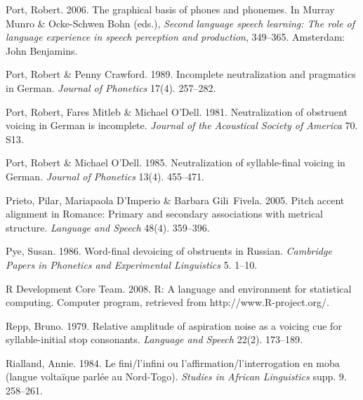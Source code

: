 \documentclass[ number=1
,series=labphon
,output=long
,url=http://langsci-press.org/catalog/book/16
,isbn=978-3-944675-01-5
]{LSP/langsci}
\begin{document}
\begin{thebibliography}{284}
Port, Robert. 2006.
\newblock The graphical basis of phones and phonemes.
\newblock In Murray Munro \& Ocke-Schwen Bohn (eds.), \emph{Second language
  speech learning: {T}he role of language experience in speech perception and
  production}, 349--365. Amsterdam: John Benjamins.

Port, Robert \& Penny Crawford. 1989.
\newblock Incomplete neutralization and pragmatics in {G}erman.
\newblock \emph{Journal of Phonetics} 17(4). 257--282.

Port, Robert, Fares Mitleb \& Michael O'Dell. 1981.
\newblock Neutralization of obstruent voicing in {G}erman is incomplete.
\newblock \emph{Journal of the Acoustical Society of America} 70. S13.

Port, Robert \& Michael O'Dell. 1985.
\newblock Neutralization of syllable-final voicing in {G}erman.
\newblock \emph{Journal of Phonetics} 13(4). 455--471.

Prieto, Pilar, Mariapaola D'Imperio \& Barbara Gili~Fivela. 2005.
\newblock Pitch accent alignment in {R}omance: {P}rimary and secondary
  associations with metrical structure.
\newblock \emph{Language and Speech} 48(4). 359--396.

Pye, Susan. 1986.
\newblock Word-final devoicing of obstruents in {R}ussian.
\newblock \emph{Cambridge Papers in Phonetics and Experimental Linguistics} 5.
  1--10.

{R Development Core Team}. 2008.
\newblock R: {A} language and environment for statistical computing.
\newblock Computer program, retrieved from http://www.R-project.org/.

Repp, Bruno. 1979.
\newblock Relative amplitude of aspiration noise as a voicing cue for
  syllable-initial stop consonants.
\newblock \emph{Language and Speech} 22(2). 173--189.

Rialland, Annie. 1984.
\newblock Le fini/l'infini ou l'affirmation/l'interrogation en moba (langue
  volta{\"i}que parl{\'e}e au {N}ord-{T}ogo).
\newblock \emph{Studies in African Linguistics} supp. 9. 258--261.


\end{thebibliography}
\end{document}
